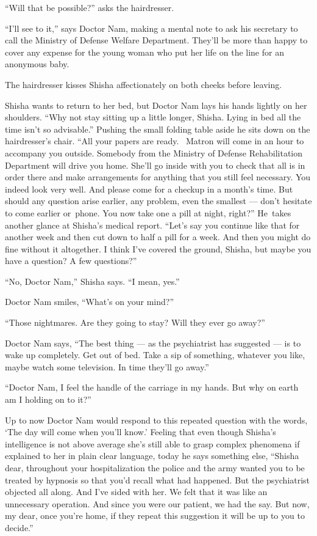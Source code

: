 \documentclass[twoside,11pt,openany]{book}
\begin{document}
``Will that be possible?'' asks the hairdresser.

``I'll see to it,'' says Doctor Nam, making a mental note to ask his secretary to call the
Ministry of Defense Welfare Department. They'll be more than happy to cover any expense for the young woman who put her
life on the line for an anonymous baby.

The hairdresser kisses Shisha affectionately on both cheeks before leaving.

Shisha wants to return to her bed, but Doctor Nam lays his hands lightly on    her shoulders. ``Why not
stay sitting up a little longer, Shisha. Lying in bed all the time isn't so advisable.''  Pushing the
small folding table aside he sits down on the hairdresser's chair. ``All your papers are
ready.{~} Matron will come in an hour to accompany you outside. Somebody from the Ministry of Defense
Rehabilitation Department will drive you home. She'll go inside with you to check that all is in order there and make
arrangements for anything that you still feel necessary. You indeed look very well. And please come for a checkup in a
month's time.  But should any question arise earlier, any problem, even the smallest --- don't hesitate to come earlier
or~phone. You now take one a pill at night, right?'' He~takes another glance at Shisha's medical report.
``Let's say you continue like that for another week and then cut down to half a pill for a week. And then
you might do fine without it altogether. I think I've covered the ground, Shisha, but maybe you have a question? A few
questions?''

``No, Doctor Nam,'' Shisha says. ``I mean, yes.''

Doctor Nam smiles, ``What's on your mind?''

``Those nightmares. Are they going to stay? Will they ever go away?''

Doctor Nam says, ``The best thing --- as the psychiatrist has suggested --- is to wake up completely. Get out
of bed. Take a sip of something,{ }whatever you like, maybe watch some
television. In time they'll go away.''

``Doctor Nam, I feel the handle of the carriage in my hands. But why on earth am I holding on to
it?''

Up to now Doctor Nam would respond to this repeated question with the words, `The day will come when you'll know.'
Feeling that even though Shisha's intelligence is not above average she's still able to grasp complex phenomena if
explained to her in plain clear language, today he says something else, ``Shisha dear, throughout your
hospitalization the police and the army wanted you to be treated by hypnosis so that you'd recall what had happened.
But the psychiatrist objected all along. And I've sided with her. We felt that it was like an unnecessary operation.
And since you were our patient, we had the say. But now, my dear, once you're home, if they repeat this suggestion it
will be up to you to decide.''
\end{document}

